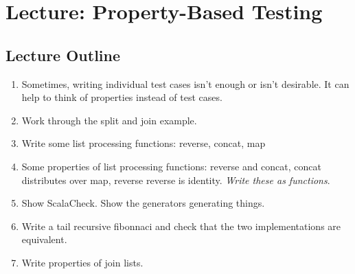 \chapter{Lecture: Property-Based Testing}
\startlecture

\begin{instructor}

\section*{Lecture Outline}

\begin{enumerate}

\item  Sometimes, writing individual test cases isn't enough or isn't desirable.
  It can help to think of properties instead of test cases.

\item Work through the split and join example.

\item Write some list processing functions: reverse, concat, map

\item Some properties of list processing functions: reverse and concat,
  concat distributes over map, reverse reverse is identity. \emph{Write these
    as functions}.

\item Show ScalaCheck. Show the generators generating things.

\item Write a tail recursive fibonnaci and check that the two implementations
are equivalent.

\item Write properties of join lists.

\end{enumerate}

\end{instructor}




